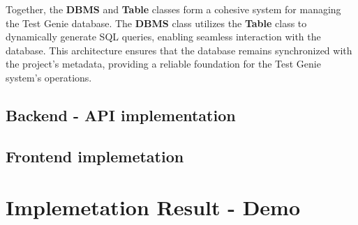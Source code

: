 Together, the \textbf{DBMS} and \textbf{Table} classes form a cohesive system for managing the Test Genie database. The \textbf{DBMS} class utilizes the \textbf{Table} class to dynamically generate SQL queries, enabling seamless interaction with the database. This architecture ensures that the database remains synchronized with the project's metadata, providing a reliable foundation for the Test Genie system's operations.

\subsection{Backend - API implementation}

\subsection{Frontend implemetation}

\section{Implemetation Result - Demo}